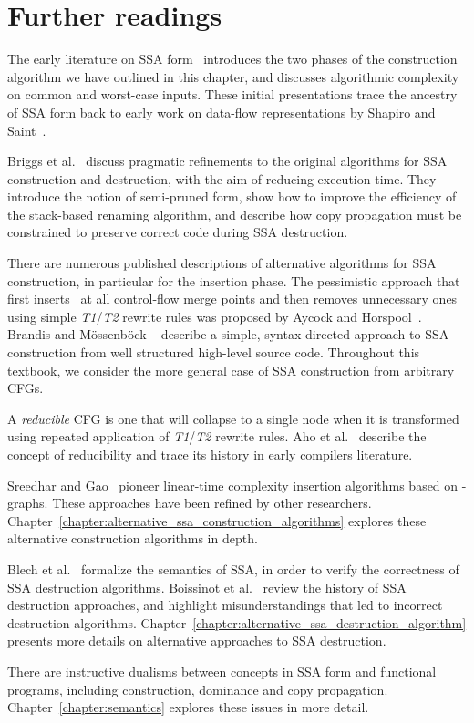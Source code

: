 {\section{Further readings}
\label{sec:classical_construction_algorithm:reading}

The early literature on SSA form~\cite{cytron89efficient,Cytron:1991:TOPLAS} introduces the two phases of the construction algorithm we have outlined in this chapter, and discusses algorithmic complexity on common and worst-case inputs. 
These initial presentations trace the ancestry of SSA form back to early work on data-flow representations by Shapiro and Saint~\cite{shapiro69representation}.

Briggs et al.~\cite{BriggsSSA} discuss pragmatic refinements to the original algorithms for SSA construction and destruction, with the aim of reducing execution time. 
They introduce the notion of semi-pruned form, show how to improve the efficiency of the stack-based renaming algorithm, and describe how copy propagation must be constrained to preserve correct code during SSA destruction.

There are numerous published descriptions of alternative algorithms for SSA construction, in particular for the \phifun insertion phase. 
The pessimistic approach that first inserts \phifuns\ at all control-flow merge points and then removes unnecessary ones using simple \emph{T1}/\emph{T2} rewrite rules was proposed by Aycock and Horspool~\cite{aycock00simple}. 
Brandis and M\"{o}ssenb\"{o}ck ~\cite{brandis94single} describe a simple, syntax-directed approach to SSA construction from well structured high-level source code. 
Throughout this textbook, we consider the more general case of SSA construction from arbitrary CFGs.

A \textit{reducible} CFG is one that will collapse to a single node when it is transformed using repeated application of \emph{T1}/\emph{T2} rewrite rules. 
Aho et al.~\cite{Aho:1986:Book} describe the concept of reducibility and trace its history in early compilers literature.

Sreedhar and Gao~\cite{Sreedhar:1995:PoPL} pioneer linear-time complexity \phifun insertion algorithms based on \DJ-graphs. 
These approaches have been refined by other researchers. 
Chapter~\ref{chapter:alternative_ssa_construction_algorithms} explores these alternative construction algorithms in depth.


Blech et al.~\cite{blech05optimizing} formalize the semantics of SSA, in order to verify the correctness of SSA destruction algorithms. 
Boissinot et al.~\cite{boissinot09revisiting} review the history of SSA destruction approaches, and highlight misunderstandings that led to incorrect destruction algorithms. 
Chapter~\ref{chapter:alternative_ssa_destruction_algorithm} presents more details on alternative approaches to SSA destruction.

There are instructive dualisms between concepts in SSA form and functional programs, including construction, dominance and copy propagation. 
Chapter~\ref{chapter:semantics} explores these issues in more detail.


}

